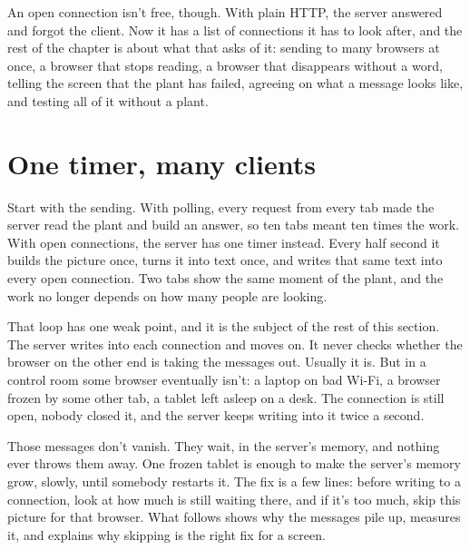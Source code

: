 An open connection isn't free, though. With plain HTTP, the server answered and
forgot the client. Now it has a list of connections it has to look after, and
the rest of the chapter is about what that asks of it: sending to many browsers
at once, a browser that stops reading, a browser that disappears without a word,
telling the screen that the plant has failed, agreeing on what a message looks
like, and testing all of it without a plant.

\section{One timer, many clients}

Start with the sending. With polling, every request from every tab made the
server read the plant and build an answer, so ten tabs meant ten times the work.
With open connections, the server has one timer instead. Every half second it
builds the picture once, turns it into text once, and writes that same text
into every open connection. Two tabs show the same moment of the plant, and the
work no longer depends on how many people are looking.

That loop has one weak point, and it is the subject of the rest of this section.
The server writes into each connection and moves on. It never checks whether the
browser on the other end is taking the messages out. Usually it is. But in a
control room some browser eventually isn't: a laptop on bad Wi-Fi, a browser
frozen by some other tab, a tablet left asleep on a desk. The connection is
still open, nobody closed it, and the server keeps writing into it twice a
second.

Those messages don't vanish. They wait, in the server's memory, and nothing
ever throws them away. One frozen tablet is enough to make the server's memory
grow, slowly, until somebody restarts it. The fix is a few lines: before
writing to a connection, look at how much is still waiting there, and if it's
too much, skip this picture for that browser. What follows shows why the
messages pile up, measures it, and explains why skipping is the right fix for a
screen.

